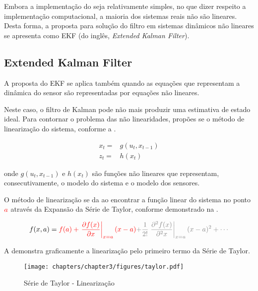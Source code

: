 Embora a implementação do  seja relativamente simples, no que dizer respeito a implementação computacional, a maioria dos sistemas reais não são lineares. Desta forma, a proposta para solução do filtro em sistemas dinâmicos não lineares se apresenta como EKF (do inglês, \textit{Extended Kalman Filter}).


\subsection{Extended Kalman Filter}

A proposta do EKF se aplica também quando as equações que representam a dinâmica do sensor são representadas por equações não lineares.

Neste caso, o filtro de Kalman pode não mais produzir uma estimativa de estado ideal. Para contornar o problema das não linearidades, propões se o método de linearização do sistema, conforme a .

\begin{equation}
    \begin{split}
    x_t = & g(u_t, x_{t-1})\\
    z_t = & h(x_t)
    \end{split}
    \label{eq:ekf1}
\end{equation}
    
\noindent onde $g(u_t, x_{t-1})$ e $h(x_t)$ são funções não lineares que representam, consecutivamente, 
o modelo do sistema e o modelo dos sensores.

O método de linearização se da ao encontrar a função linear do sistema no ponto $\textcolor{red}{a}$ através da Expansão da Série de Taylor, conforme demonstrado na .

\begin{equation}
    f(x,a) = \textcolor{red}{f(a) + \left. \frac{\partial f(x)}{\partial x} \right\vert_{x=a}(x-a)}
    \textcolor{gray}{+\frac{1}{2!}\left. \frac{\partial^2 f(x)}{\partial^2 x} \right\vert_{x=a}(x-a)^2 + \cdots}
    \label{eq:taylor1}
\end{equation}

A  demonstra graficamente a linearização pelo primeiro termo da Série de Taylor.

\begin{figure}[!ht]
    \centering
    \texttt{[image: chapters/chapter3/figures/taylor.pdf]}
    \caption{Série de Taylor - Linearização}
    \label{fig:taylor}
\end{figure}

